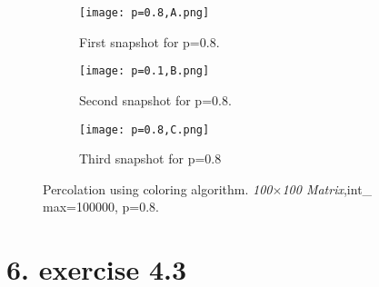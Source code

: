\documentclass[12pt]{article}
\begin{document}
\begin{figure}[H]
	\begin{subfigure}[t]{0.3\textwidth}
		\centering
		\texttt{[image: p=0.8,A.png]}
		\label{fig:mesh7.1}
		\caption{First snapshot for p=0.8.}
	\end{subfigure}\hfill
	\begin{subfigure}[t]{0.3\textwidth}
		\centering
		\texttt{[image: p=0.1,B.png]}
		\label{fig:mesh7.2}
		\caption{Second snapshot for p=0.8.}
	\end{subfigure}\hfill
	\begin{subfigure}[t]{0.3\textwidth}
		\centering
		\texttt{[image: p=0.8,C.png]}
		\label{fig:mesh7.3}
		\caption{Third snapshot for p=0.8}
	\end{subfigure}
	\centering
	\label{fig:mesh7}
	\caption{Percolation using coloring algorithm. \textit{100$\times$100 Matrix},int\_ max=100000, p=0.8.}
\end{figure}

\part*{6. exercise 4.3}
\end{document}
